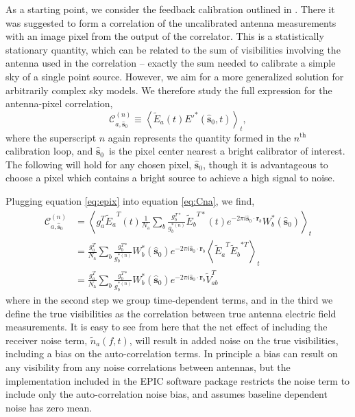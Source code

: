 \documentclass[a4paper,fleqn,usenatbib]{../mnras}
\newcommand{\Nant}{\ensuremath{N_{\mathrm{a}}}}
\newcommand{\spix}{\ensuremath{\hat{\mathbf{s}}_{0}}}
\newcommand{\Cna}[1][n]{\ensuremath{\mathcal{C}^{(#1)}_{a,\spix}}}
\newcommand{\rb}{\ensuremath{\mathbf{r}_b}}
\newcommand{\beamtheta}{\ensuremath{W}}
\newcommand{\Er}[1]{\ensuremath{\widetilde{E}_{#1}}}
\newcommand{\V}{\ensuremath{\widetilde{V}}}
\begin{document}
As a starting point, we consider the feedback calibration outlined in \citealt{mor11}. There it was suggested to form a correlation of the uncalibrated antenna measurements with an image pixel from the output of the correlator. This is a statistically stationary quantity, which can be related to the sum of visibilities involving the antenna used in the correlation -- exactly the sum needed to calibrate a simple sky of a single point source. However, we aim for a more generalized solution for arbitrarily complex sky models. We therefore study the full expression for the antenna-pixel correlation,
\begin{equation}\label{eq:Cna}
\Cna \equiv \left<\Er{a}(t) E'^*(\spix,t)\right>_t,
\end{equation}
where the superscript $n$ again represents the quantity formed in the $n^\mathrm{th}$ calibration loop, and \spix\, is the pixel center nearest a bright calibrator of interest. The following will hold for any chosen pixel, \spix, though it is advantageous to choose a pixel which contains a bright source to achieve a high signal to noise. 

Plugging equation \ref{eq:epix} into equation \ref{eq:Cna}, we find,
\begin{align}\label{eq:cna}
\Cna & = \left<g^T_a \Er{a}^T(t) \frac{1}{\Nant} \sum_b \frac{g^{T*}_b}{g^{*(n)}_b}\Er{b}^{T*}(t) e^{-2\pi i \spix \cdot \rb} \beamtheta^*_b(\spix)\right>_t \nonumber \\
& = \frac{g^T_a}{\Nant} \sum_b \frac{g^{T*}_b}{g^{*(n)}_b} \beamtheta^*_b(\spix) e^{-2\pi i \spix \cdot \rb} \left<\Er{a}^T \Er{b}^{*T} \right>_t \nonumber \\
& = \frac{g^T_a}{\Nant} \sum_b \frac{g^{T*}_b}{g^{*(n)}_b} \beamtheta^*_b(\spix) e^{-2\pi i \spix \cdot \rb} \V^T_{ab}
\end{align}
where in the second step we group time-dependent terms, and in the third we define the true visibilities as the correlation between true antenna electric field measurements. It is easy to see from here that the net effect of including the receiver noise term, $\widetilde{n}_a(f,t)$, will result in added noise on the true visibilities, including a bias on the auto-correlation terms. In principle a bias can result on any visibility from any noise correlations between antennas, but the implementation included in the EPIC software package restricts the noise term to include only the auto-correlation noise bias, and assumes baseline dependent noise has zero mean.
\end{document}
